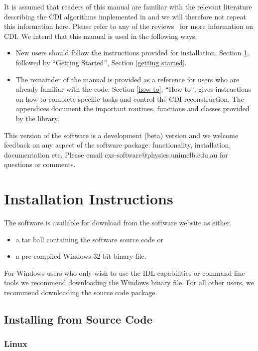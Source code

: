 \documentclass[]{cxs-software}
\begin{document}
It is assumed that readers of this manual are familiar with the
relevant literature describing the CDI algorithms implemented in \name
and we will therefore not repeat this information here. Please refer
to any of the reviews~\cite{} for more information on CDI. We intend
that this manual is used in the following ways:
\begin{itemize}
\item New users should follow the instructions provided for
  installation, Section \ref{installation}, followed by ``Getting
  Started'', Section \ref{getting started}.
\item The remainder of the manual is provided as a reference for users
  who are already familiar with the code. Section \ref{how to}, ``How
  to'', gives instructions on how to complete specific tasks and
  control the CDI reconstruction. The appendices document the
  important routines, functions and classes provided by the \name
  library.
\end{itemize}
This version of the software is a development (beta) version and we
welcome feedback on any aspect of the software package: functionality,
installation, documentation etc. Please email
cxs-software@physics.unimelb.edu.au for questions or comments.


\newpage
\section{Installation Instructions}
\label{installation}

The software is available for download from the software website as either,
\begin{itemize}
\item a tar ball containing the software source code or
\item a pre-compiled Windows 32 bit binary file.
\end{itemize}

For Windows users who only wish to use the IDL capabilities or
command-line tools we recommend downloading the Windows binary file. For
all other users, we recommend downloading the source code package.

\subsection{Installing from Source Code}

\subsubsection{Linux}
\end{document}
